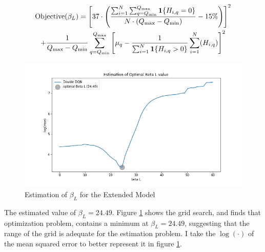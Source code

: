 \begin{multline}
   \text{Objective}(\beta_L) =  \left[ 37 \cdot \left(\frac{\sum_{i=1}^{N} \sum_{q=Q_{\min}}^{Q_{\max}} \mathbf{1}\{H_{i,q} = 0\}}{ N \cdot (Q_{\max} - Q_{\min} )} - 15\% \right) \right]^2 \\ + \frac{1}{Q_{\max} - Q_{\min}}\sum_{q=Q_{\min}}^{Q_{\max}} \left[ \mu_q - \frac{1}{\sum_{i=1}^{N} \mathbf{1}\{H_{i,q} > 0\}}\sum_{i=1}^N (H_{i,q})\right]^2
\end{multline}

\begin{figure}[ht]
    \centering
    \includegraphics[scale=0.4]{figures/ddqn_extended_model_estimation_beta_L.png}
    \caption{Estimation of $\beta_L$ for the Extended Model}
    \label{fig:estimation_extended}
\end{figure}

The estimated value of $\beta_L = 24.49$. Figure \ref{fig:estimation_extended} shows the grid search, and finds that optimization problem, contains a minimum at $\beta_L = 24.49$, suggesting that the range of the grid is adequate for the estimation problem. I take the $\log (\cdot)$ of the mean squared error to better represent it in figure \ref{fig:estimation_extended}.